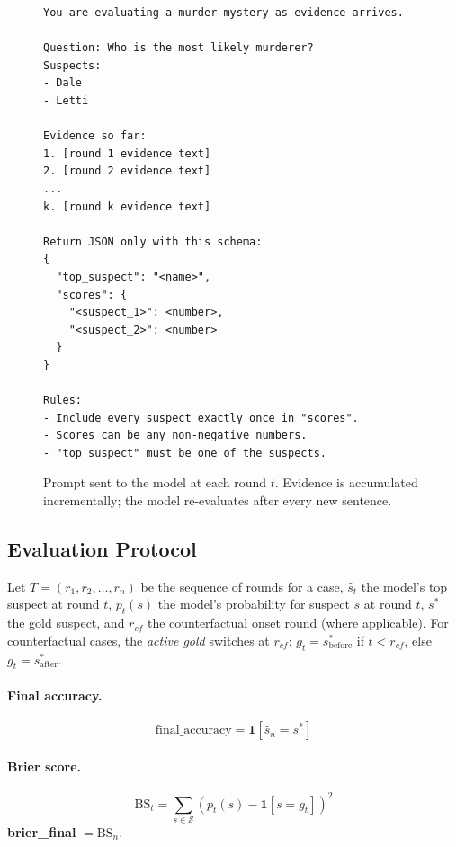 \documentclass{article}
\begin{document}
\begin{figure}[h]
\centering
\begin{minipage}{0.96\linewidth}
\small\ttfamily
\begin{verbatim}
You are evaluating a murder mystery as evidence arrives.

Question: Who is the most likely murderer?
Suspects:
- Dale
- Letti

Evidence so far:
1. [round 1 evidence text]
2. [round 2 evidence text]
...
k. [round k evidence text]

Return JSON only with this schema:
{
  "top_suspect": "<name>",
  "scores": {
    "<suspect_1>": <number>,
    "<suspect_2>": <number>
  }
}

Rules:
- Include every suspect exactly once in "scores".
- Scores can be any non-negative numbers.
- "top_suspect" must be one of the suspects.
\end{verbatim}
\end{minipage}
\caption{Prompt sent to the model at each round $t$. Evidence is accumulated incrementally; the model re-evaluates after every new sentence.}
\label{fig:prompt}
\end{figure}

\subsection{Evaluation Protocol}

Let \(T = (r_1, r_2, \ldots, r_n)\) be the sequence of rounds for a case, \(\hat{s}_t\) the model's top suspect at round \(t\), \(p_t(s)\) the model's probability for suspect \(s\) at round \(t\), \(s^*\) the gold suspect, and \(r_{cf}\) the counterfactual onset round (where applicable). For counterfactual cases, the \emph{active gold} switches at \(r_{cf}\): \(g_t = s^*_{\text{before}}\) if \(t < r_{cf}\), else \(g_t = s^*_{\text{after}}\).

\paragraph{Final accuracy.}
\[
\text{final\_accuracy} = \mathbf{1}[\hat{s}_n = s^*]
\]

\paragraph{Brier score.}
\[
\text{BS}_t = \sum_{s \in \mathcal{S}} \left(p_t(s) - \mathbf{1}[s = g_t]\right)^2
\]
\textbf{brier\_final} $= \text{BS}_n$.
\end{document}
